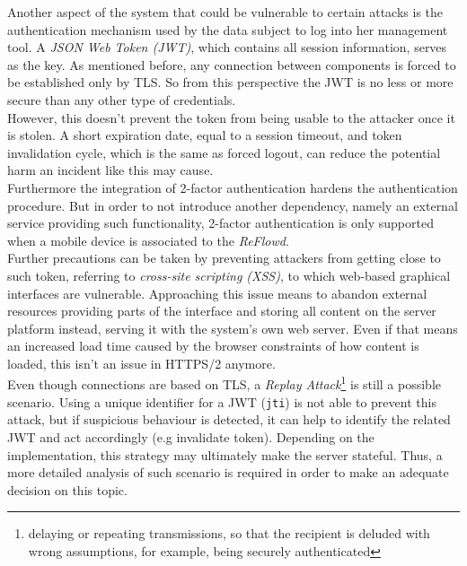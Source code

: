\documentclass[12pt,english,a4paper,titlepage,cleardoublepage=empty,dottedtoc]{report}
\begin{document}
Another aspect of the system that could be vulnerable to certain attacks
is the authentication mechanism used by the data subject to log into her
management tool. A \emph{JSON Web Token (JWT)}, which contains all
session information, serves as the key. As mentioned before, any
connection between components is forced to be established only by TLS.
So from this perspective the JWT is no less or more secure than any
other type of credentials.\\
However, this doesn't prevent the token from being usable to the
attacker once it is stolen. A short expiration date, equal to a session
timeout, and token invalidation cycle, which is the same as forced
logout, can reduce the potential harm an incident like this may cause.\\
Furthermore the integration of 2-factor authentication hardens the
authentication procedure. But in order to not introduce another
dependency, namely an external service providing such functionality,
2-factor authentication is only supported when a mobile device is
associated to the \emph{ReFlowd}.\\
Further precautions can be taken by preventing attackers from getting
close to such token, referring to \emph{cross-site scripting (XSS)}, to
which web-based graphical interfaces are vulnerable. Approaching this
issue means to abandon external resources providing parts of the
interface and storing all content on the server platform instead,
serving it with the system's own web server. Even if that means an
increased load time caused by the browser constraints of how content is
loaded, this isn't an issue in HTTPS/2 anymore.\\
Even though connections are based on TLS, a \emph{Replay
Attack}\footnote{delaying or repeating transmissions, so that the
  recipient is deluded with wrong assumptions, for example, being
  securely authenticated} is still a possible scenario. Using a unique
identifier for a JWT (\texttt{jti}) is not able to prevent this attack,
but if suspicious behaviour is detected, it can help to identify the
related JWT and act accordingly (e.g invalidate token). Depending on the
implementation, this strategy may ultimately make the server stateful.
Thus, a more detailed analysis of such scenario is required in order to
make an adequate decision on this topic.
\end{document}
